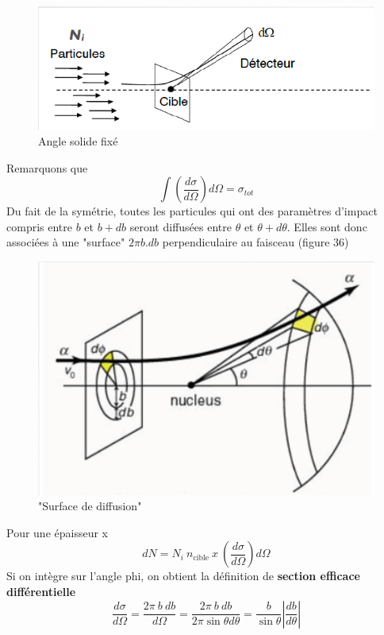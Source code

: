     \begin{figure}[ht]
        \centering
        \includegraphics[scale=0.75]{Images1/anglesolide.PNG}
        \caption{Angle solide fixé}
    \end{figure}
Remarquons que 
    \[
        \int(\dfrac{d\sigma}{d\Omega})d\Omega=\sigma_{tot}
    \]
Du fait de la symétrie, toutes les particules qui ont des paramètres d'impact compris entre $b$ et $b+db$ seront diffusées entre $\theta$ et $\theta+d\theta$. Elles sont donc associées à une "surface" $2\pi b.db$ perpendiculaire au faisceau (figure 36)

    \begin{figure}[ht]
        \centering
        \includegraphics[scale=0.75]{Images1/surface_perp.PNG}
        \caption{"Surface de diffusion"}
    \end{figure}
Pour une épaisseur x
    \[
        dN=N_i~n_{\text{cible}}~x~(\dfrac{d\sigma}{d\Omega})d\Omega
    \]
Si on intègre sur l'angle phi, on obtient la définition de \textbf{section efficace différentielle}
    \[
        \dfrac{d\sigma}{d\Omega}=\dfrac{2\pi~ b~db}{d\Omega}=\dfrac{2\pi~b~db}{2\pi \sin{\theta}d\theta}=\dfrac{b}{\sin{\theta}}{|\dfrac{db}{d\theta}|}
    \]
    
